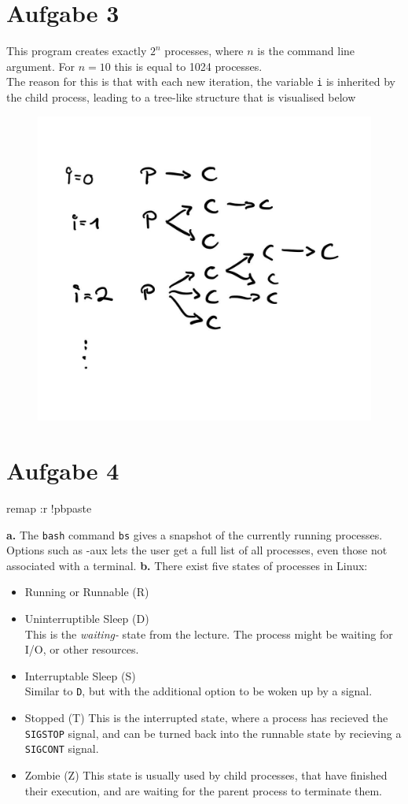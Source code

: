 \documentclass{article}
\begin{document}
\section*{Aufgabe 3}
This program creates exactly \( 2 ^{n} \) processes, where \( n \) is the
command line argument. For \( n = 10 \) this is equal to 1024 processes.\\
The reason for this is that with each new iteration, the variable
\texttt{i} is inherited by the child process, leading to a tree-like
structure that is visualised below
\begin{figure}[H]
    \centering
    \includegraphics[width=.5\textwidth]{Fork.jpg}
\end{figure}
\section*{Aufgabe 4}
remap  :r !pbpaste


\textbf{a.} The \texttt{bash} command \texttt{bs} gives a snapshot of the currently
running processes. Options such as -aux lets the user get a full list of all
processes, even those not associated with a terminal.
\textbf{b.} There exist five states of processes in Linux:
\begin{itemize}
\item Running or Runnable (R)
\item Uninterruptible Sleep (D) \\ This is the \textit{waiting-} state 
    from the lecture. The process might be waiting for I/O, or other resources.
\item Interruptable Sleep (S) \\
    Similar to \texttt{D}, but with the additional option to be woken up by a
    signal.
\item Stopped (T)
    This is the interrupted state, where a process has recieved the
    \texttt{SIGSTOP} signal, and can be turned back into the runnable
    state by recieving a \texttt{SIGCONT} signal.
\item Zombie (Z)
    This state is usually used by child processes, that have finished their
    execution, and are waiting for the parent process to terminate them.
\end{itemize}
\end{document}
